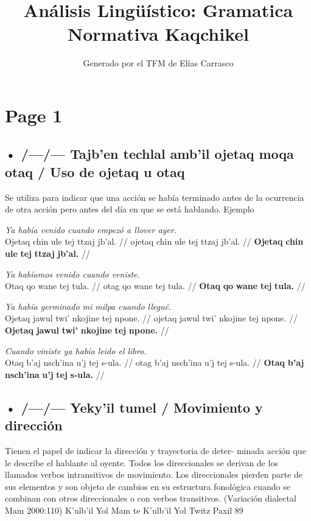 \documentclass{article}%
\title{Análisis Lingüístico: Gramatica Normativa Kaqchikel}%
\author{Generado por el TFM de Elías Carrasco}%
\begin{document}
%
\normalsize%
\maketitle%
\section{Page 1}%
\label{sec:Page1}%
\subsection{• /—/— Tajb’en techlal amb’il ojetaq moqa otaq / Uso de ojetaq u otaq}%
\label{subsec://Tajbentechlalambilojetaqmoqaotaq/Usodeojetaquotaq}%

%
Se utiliza para indicar que una acción se había terminado antes %
de la ocurrencia de otra acción pero antes del día en que se %
está hablando. %
Ejemplo %
\par\medskip%
\ex
\textit{Ya había venido cuando empezó a llover ayer.} \\
\begingl
\gla Ojetaq chin ule tej ttzaj jb’al. //
\glb ojetaq chin ule tej ttzaj jb’al. //
\glc \textbf{Ojetaq} \textbf{chin} \textbf{ule} \textbf{tej} \textbf{ttzaj} \textbf{jb’al.} //
\endgl
\xe
%
\medskip%
\par\medskip%
\ex
\textit{Ya habíamos venido cuando veniste.} \\
\begingl
\gla Otaq qo wane tej tula. //
\glb otag qo wane tej tula. //
\glc \textbf{Otaq} \textbf{qo} \textbf{wane} \textbf{tej} \textbf{tula.} //
\endgl
\xe
%
\medskip%
\par\medskip%
\ex
\textit{Ya había germinado mi milpa cuando llegué.} \\
\begingl
\gla Ojetaq jawul twi' nkojine tej npone. //
\glb ojetaq jawul twi' nkojine tej npone. //
\glc \textbf{Ojetaq} \textbf{jawul} \textbf{twi'} \textbf{nkojine} \textbf{tej} \textbf{npone.} //
\endgl
\xe
%
\medskip%
\par\medskip%
\ex
\textit{Cuando viniste ya había leido el libro.} \\
\begingl
\gla Otaq b'aj nsch'ina u'j tej s-ula. //
\glb otag b'aj nsch'ina u'j tej s-ula. //
\glc \textbf{Otaq} \textbf{b'aj} \textbf{nsch'ina} \textbf{u'j} \textbf{tej} \textbf{s-ula.} //
\endgl
\xe
%
\medskip%
\subsection{• /—/— Yeky'il tumel / Movimiento y dirección}%
\label{subsec://Yekyiltumel/Movimientoydireccin}%

%
Tienen el papel de indicar la dirección y trayectoria de deter{-} %
minada acción que le describe el hablante al oyente. Todos los %
direccionales se derivan de los llamados verbos intransitivos de %
movimiento. Los direccionales pierden parte de sus elementos %
y son objeto de cambios en su estructura fonológica cuando %
se combinan con otros direccionales o con verbos transitivos. %
(Variación dialectal Mam 2000:110) %
K'ulb'il Yol Mam te K'ulb'il Yol Twitz Paxil %
89 

%
\end{document}
